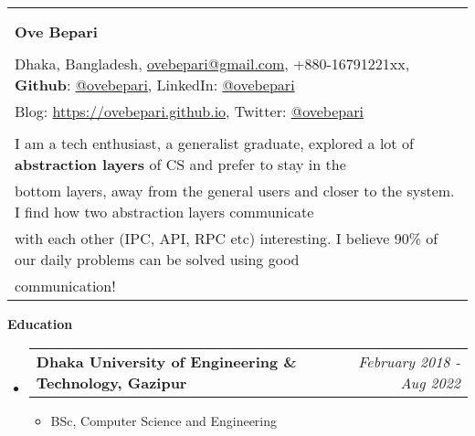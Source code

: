 \documentclass[legalpaper,10pt]{article}
\makeatletter
\newcommand{\resheading}[1]{{\large \colorbox{mygrey}{\begin{minipage}{\textwidth}{\textbf{#1 \vphantom{p\^{E}}}}\end{minipage}}}}
\newcommand{\ressubheading}[4]{
	\begin{tabular*}{7.1in}{l@{\extracolsep{\fill}}r}
		\textbf{#1} & \textit{#4} \\
	\end{tabular*}\vspace{-6pt}}
\makeatother
\begin{document}
	\begin{tabular*}{7.5in}{l@{\extracolsep{\fill}}}
		\\
		\\
		\\
		\textbf{\large Ove Bepari}\\
		\\
		Dhaka, Bangladesh, \href{mailto:ovebepari@gmail.com}{ovebepari@gmail.com}, +880-16791221xx, \textbf{Github}: \href{https://github.com/ovebepari}{@ovebepari}, LinkedIn: \href{https://linkedin.com/in/ovebepari}{@ovebepari} \\
		 Blog: \url{https://ovebepari.github.io}, Twitter: \href{https://twitter.com/ovebepari}{@ovebepari}
		\\
		\\
		I am a tech enthusiast, a generalist graduate, explored a lot of \textbf{abstraction layers} of CS and prefer to stay in the\\bottom layers, away from the general users and closer to the system. I find how two abstraction layers communicate\\with each other (IPC, API, RPC etc) interesting. I believe 90\% of our daily problems can be solved using good\\ communication!
	\end{tabular*}
	
	\vspace{0.25in}
	
	\resheading{Education}
	\begin{itemize}
	
		\item \ressubheading{Dhaka University of Engineering \& Technology, Gazipur}{}{}{February 2018 - Aug 2022}
		\begin{itemize}
			\item BSc, Computer Science and Engineering
		\end{itemize}
	
	\end{itemize}
	
	\vspace{0.20in}
	
\end{document}
